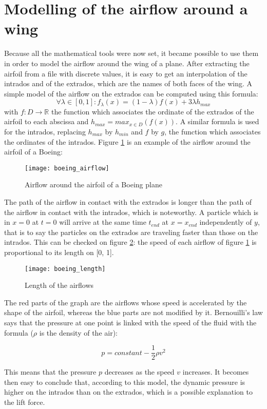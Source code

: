 \documentclass{article}
\begin{document}
\section{Modelling of the airflow around a wing}

Because all the mathematical tools were now set, it became possible to use them in order to model the airflow around the wing of a plane. After extracting the airfoil from a file with discrete values, it is easy to get an interpolation of the intrados and of the extrados, which are the names of both faces of the wing. A simple model of the airflow on the extrados can be computed using this formula:
\begin{equation}
\forall \lambda \in [0,1]: f_{\lambda}(x) = (1-\lambda)f(x) + 3\lambda h_{max}
\end{equation}
with $f: D \to \mathbb{R}$ the function which associates the ordinate of the extrados of the airfoil to each abscissa and $h_{max} = max_{x \in D}(f(x))$. A similar formula is used for the intrados, replacing $h_{max}$ by $h_{min}$ and $f$ by $g$, the function which associates the ordinates of the intrados. Figure \ref{boeing_airflow} is an example of the airflow around the airfoil of a Boeing:

\begin{figure}[h]
  \centering
  \caption{Airflow around the airfoil of a Boeing plane}
  \texttt{[image: boeing\_airflow]}
  \label{boeing_airflow}
\end{figure}

\newpage

The path of the airflow in contact with the extrados is longer than the path of the airflow in contact with the intrados, which is noteworthy. A particle which is in $x = 0$ at $t = 0$ will arrive at the same time $t_{end}$ at $x = x_{end}$ independently of $y$, that is to say the particles on the extrados are traveling faster than those on the intrados. This can be checked on figure \ref{boeing_length}: the speed of each airflow of figure \ref{boeing_airflow} is proportional to its length on [0, 1].

\begin{figure}[h]
  \centering
  \caption{Length of the airflows}
  \texttt{[image: boeing\_length]}
  \label{boeing_length}
\end{figure}

The red parts of the graph are the airflows whose speed is accelerated by the shape of the airfoil, whereas the blue parts are not modified by it. Bernouilli's law says that the pressure at one point is linked with the speed of the fluid with the formula ($\rho$ is the density of the air):

\begin{equation}
  p = constant - \frac{1}{2} \rho v^2
\end{equation}

This means that the pressure $p$ decreases as the speed $v$ increases. It becomes then easy to conclude that, according to this model, the dynamic pressure is higher on the intrados than on the extrados, which is a possible explanation to the lift force.
\end{document}
